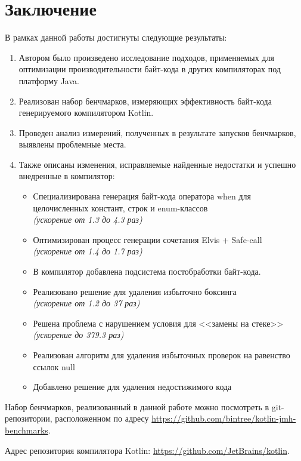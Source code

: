 \clearpage
\section*{Заключение}

В рамках данной работы достигнуты следующие результаты:

\begin{enumerate}
    \item Автором было произведено исследование подходов, применяемых для оптимизации
    производительности байт-кода в других компиляторах под платформу Java.

    \item Реализован набор бенчмарков, измеряющих эффективность байт-кода генерируемого
    компилятором Kotlin.

    \item Проведен анализ измерений, полученных в результате запусков бенчмарков, выявлены
    проблемные места.

    \item Также описаны изменения, исправляемые найденные недостатки и успешно внедренные в компилятор:
    \begin{itemize}
        \item Специализирована генерация байт-кода оператора when для целочисленных констант, строк и enum-классов \\
        \textit{(ускорение от 1.3 до 4.3 раз)}

        \item Оптимизирован процесс генерации сочетания Elvis + Safe-call \\
        \textit{(ускорение от 1.4 до 1.7 раз)}

        \item В компилятор добавлена подсистема постобработки байт-кода.
        \item Реализовано решение для удаления избыточно боксинга \\
        \textit{(ускорение от 1.2 до 37 раз)}
        \item Решена проблема с нарушением условия для <<замены на стеке>> \\
        \textit{(ускорение до 379.3 раз)}
        \item Реализован алгоритм для удаления избыточных проверок на равенство ссылок null
        \item Добавлено решение для удаления недостижимого кода
    \end{itemize}
\end{enumerate}

Набор бенчмарков, реализованный в данной работе можно посмотреть в git-репозитории, расположенном
по адресу \url{https://github.com/bintree/kotlin-jmh-benchmarks}.

Адрес репозитория компилятора Kotlin: \url{https://github.com/JetBrains/kotlin}.

